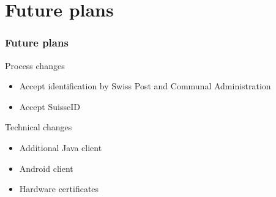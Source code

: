 \documentclass[aspectratio=1610, compress, bigger]{beamer}
\begin{document}
\section{Future plans}
\begin{frame}\frametitle{Future plans}

\begin{block}{Process changes}
\begin{itemize}
\item Accept identification by Swiss Post and Communal Administration
\item Accept SuisseID
\end{itemize}
\end{block}

\pause

\begin{block}{Technical changes}
\begin{itemize}
\item Additional Java client
\item Android client
\item Hardware certificates
\end{itemize}
\end{block}

\end{frame}
\end{document}
